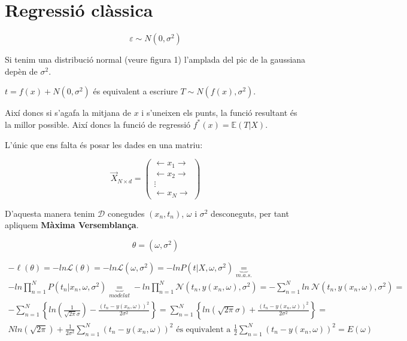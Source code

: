 \documentclass[a4paper]{article}
\begin{document}
\section{Regressió clàssica}

$$
\varepsilon \sim N(0, \sigma^2)
$$

Si tenim una distribució normal (veure figura 1) l'amplada del pic de la gaussiana depèn de $\sigma^2$.



$ t = f(x) + N(0, \sigma^2) $ és equivalent a escriure $T \sim N(f(x), \sigma^2) $.

Així doncs si s'agafa la mitjana de $x$ i s'uneixen els punts, la funció resultant és la millor possible. Així doncs la funció de regressió $f^*(x) = \mathbb{E}(T|X)$.

L'únic que ens falta és posar les dades en una matriu:

$$
\vec{X}_{N \times d} =
\begin{pmatrix}
\longleftarrow x_1 \longrightarrow \\
\longleftarrow x_2 \longrightarrow \\
\vdots \\
\longleftarrow x_N \longrightarrow
\end{pmatrix}
$$

D'aquesta manera tenim $\mathcal{D}$ conegudes $(x_n, t_n)$, $\omega$ i $\sigma^2$ desconeguts, per tant apliquem \textbf{Màxima Versemblança}.

$$
\theta = (\omega, \sigma^2)
$$

\begin{gather*}
-\ell (\theta) = -ln \mathcal{L} (\theta) = 
-ln \mathcal{L}(\omega, \sigma^2) =
-ln P(t | X, \omega, \sigma^2) \underbrace{=}_{m.a.s.} \\
-ln \prod_{n=1}^N P(t_n | x_n, \omega, \sigma^2) \underbrace{=}_{modelat}
-ln \prod_{n=1}^N \mathcal{N} (t_n, y(x_n, \omega), \sigma^2) =
- \sum_{n=1}^N ln \ \mathcal{N} (t_n, y(x_n, \omega), \sigma^2) = \\
- \sum_{n=1}^N \left\{ ln \left( \frac{1}{\sqrt{2\pi}\sigma} \right) - \frac{(t_n - y(x_n, \omega))^2}{2\sigma^2} \right\} = 
\sum_{n=1}^N \left\{ ln(\sqrt{2\pi}\sigma) + \frac{(t_n - y(x_n, \omega))^2}{2\sigma^2} \right\} = \\
N ln (\sqrt{2\pi}) + \frac{1}{2\sigma^2} \sum_{n=1}^N (t_n - y(x_n,\omega))^2 \text{ és equivalent a } \frac{1}{2} \sum_{n=1}^N (t_n - y(x_n, \omega))^2 = E(\omega)
\end{gather*}
\end{document}
